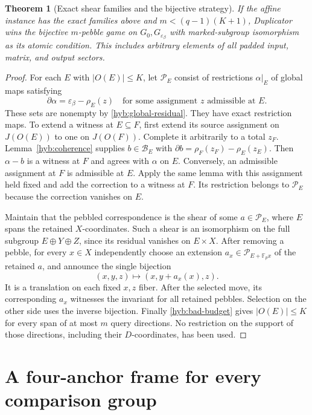 \documentclass[11pt]{article}
\newcommand{\F}{\mathbb F_p}
\newtheorem{theorem}{Theorem}[section]
\theoremstyle{definition}
\theoremstyle{remark}
\numberwithin{equation}{section}
\begin{document}
\begin{theorem}[Exact shear families and the bijective strategy]
\label{hyb:forward}
If the affine instance has the exact families above and
$m<(q-1)(K+1)$, Duplicator wins the bijective $m$-pebble game on
$G_0,G_{\varepsilon_\beta}$ with marked-subgroup isomorphism as its
atomic condition.  This includes arbitrary elements of all padded
input, matrix, and output sectors.
\end{theorem}

\begin{proof}
For each $E$ with $|O(E)|\le K$, let $\mathcal P_E$ consist of
restrictions $\alpha|_E$ of global maps satisfying
\[
 \partial\alpha=\varepsilon_\beta-\rho_E(z)
       \quad\text{for some assignment }z\text{ admissible at }E.
\]
These sets are nonempty by \eqref{hyb:global-residual}.  They have exact
restriction maps.  To extend a witness at $E\subseteq F$, first extend
its source assignment on $J(O(E))$ to one on $J(O(F))$.  Complete it
arbitrarily to a total $z_F$.  Lemma~\ref{hyb:coherence} supplies
$b\in\mathcal B_E$ with
$\partial b=\rho_F(z_F)-\rho_E(z_E)$.
Then $\alpha-b$ is a witness at $F$ and agrees with $\alpha$ on $E$.
Conversely, an admissible assignment at $F$ is admissible at $E$.
Apply the same lemma with this assignment held fixed and add the
correction to a witness at $F$.  Its restriction belongs to
$\mathcal P_E$ because the correction vanishes on $E$.

Maintain that the pebbled correspondence is the shear of some
$a\in\mathcal P_E$, where $E$ spans the retained $X$-coordinates.
Such a shear is an isomorphism on the full subgroup
$E\oplus Y\oplus Z$, since its residual vanishes on $E\times X$.
After removing a pebble, for every $x\in X$ independently choose an
extension $a_x\in\mathcal P_{E+\F x}$ of the retained $a$, and announce
the single bijection
\[
 (x,y,z)\longmapsto(x,y+a_x(x),z).
\]
It is a translation on each fixed $x,z$ fiber.  After the selected
move, its corresponding $a_x$ witnesses the invariant for all
retained pebbles.  Selection on the other side uses the inverse
bijection.  Finally \eqref{hyb:bad-budget} gives $|O(E)|\le K$ for
every span of at most $m$ query directions.  No restriction on the
support of those directions, including their $D$-coordinates, has
been used.
\end{proof}


\section{A four-anchor frame for every comparison group}
\label{hyb:recognition}
\end{document}
